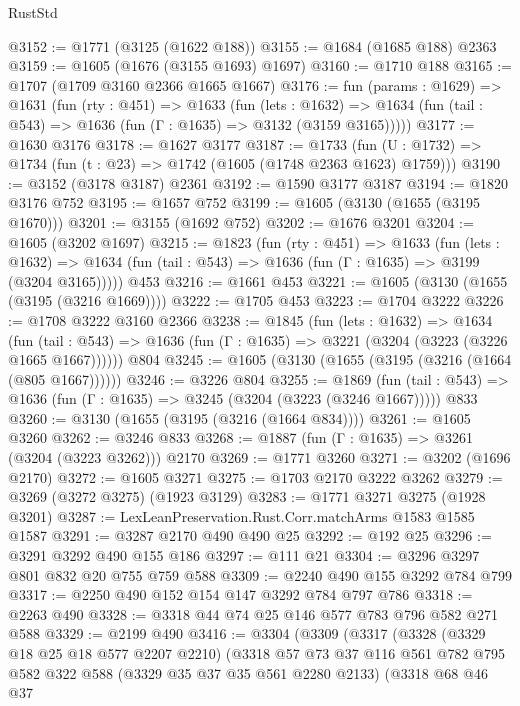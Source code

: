 \begin{lexlean}{RustStd}
\begin{coremodule}
{\begin{coremodule}
{{{{{{{{{{{{{{@3152 := @1771 (@3125 (@1622 @188))
@3155 := @1684 (@1685 @188) @2363
@3159 := @1605 (@1676 (@3155 @1693) @1697)
@3160 := @1710 @188
@3165 := @1707 (@1709 @3160 @2366 @1665 @1667)
@3176 := fun (params : @1629) =>
  @1631
    (fun (rty : @451) =>
    @1633
      (fun (lets : @1632) =>
      @1634 (fun (tail : @543) => @1636 (fun (Γ : @1635) => @3132 (@3159 @3165)))))
@3177 := @1630 @3176
@3178 := @1627 @3177
@3187 := @1733 (fun (U : @1732) => @1734 (fun (t : @23) => @1742 (@1605 (@1748 @2363 @1623) @1759)))
@3190 := @3152 (@3178 @3187) @2361
@3192 := @1590 @3177 @3187
@3194 := @1820 @3176 @752
@3195 := @1657 @752
@3199 := @1605 (@3130 (@1655 (@3195 @1670)))
@3201 := @3155 (@1692 @752)
@3202 := @1676 @3201
@3204 := @1605 (@3202 @1697)
@3215 := @1823
    (fun (rty : @451) =>
    @1633
      (fun (lets : @1632) =>
      @1634 (fun (tail : @543) => @1636 (fun (Γ : @1635) => @3199 (@3204 @3165)))))
    @453
@3216 := @1661 @453
@3221 := @1605 (@3130 (@1655 (@3195 (@3216 @1669))))
@3222 := @1705 @453
@3223 := @1704 @3222
@3226 := @1708 @3222 @3160 @2366
@3238 := @1845
    (fun (lets : @1632) =>
    @1634
      (fun (tail : @543) => @1636 (fun (Γ : @1635) => @3221 (@3204 (@3223 (@3226 @1665 @1667))))))
    @804
@3245 := @1605 (@3130 (@1655 (@3195 (@3216 (@1664 (@805 @1667))))))
@3246 := @3226 @804
@3255 := @1869
    (fun (tail : @543) => @1636 (fun (Γ : @1635) => @3245 (@3204 (@3223 (@3246 @1667)))))
    @833
@3260 := @3130 (@1655 (@3195 (@3216 (@1664 @834))))
@3261 := @1605 @3260
@3262 := @3246 @833
@3268 := @1887 (fun (Γ : @1635) => @3261 (@3204 (@3223 @3262))) @2170
@3269 := @1771 @3260
@3271 := @3202 (@1696 @2170)
@3272 := @1605 @3271
@3275 := @1703 @2170 @3222 @3262
@3279 := @3269 (@3272 @3275) (@1923 @3129)
@3283 := @1771 @3271 @3275 (@1928 @3201)
@3287 := LexLeanPreservation.Rust.Corr.matchArms @1583 @1585 @1587
@3291 := @3287 @2170 @490 @490 @25
@3292 := @192 @25
@3296 := @3291 @3292 @490 @155 @186
@3297 := @111 @21
@3304 := @3296 @3297 @801 @832 @20 @755 @759 @588
@3309 := @2240 @490 @155 @3292 @784 @799
@3317 := @2250 @490 @152 @154 @147 @3292 @784 @797 @786
@3318 := @2263 @490
@3328 := @3318 @44 @74 @25 @146 @577 @783 @796 @582 @271 @588
@3329 := @2199 @490
@3416 := @3304
    (@3309
      (@3317
        (@3328
          (@3329 @18 @25 @18 @577 @2207 @2210)
          (@3318
            @57
            @73
            @37
            @116
            @561
            @782
            @795
            @582
            @322
            @588
            (@3329 @35 @37 @35 @561 @2280 @2133)
            (@3318
              @68
              @46
              @37
}}}}}}}}}}}}}}
\end{coremodule}}
\end{coremodule}
\end{lexlean}
